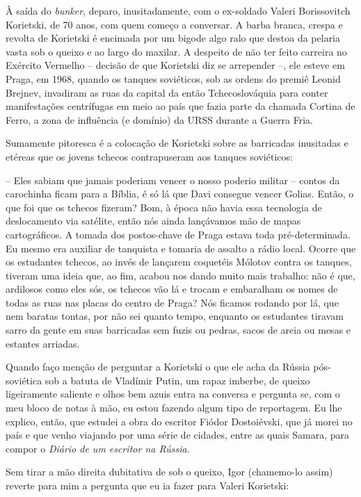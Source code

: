 À saída do \emph{bunker}, deparo, inusitadamente, com o ex-soldado
Valeri Borissovitch Korietski, de 70 anos, com quem começo a conversar.
A barba branca, crespa e revolta de Korietski é encimada por um bigode
algo ralo que destoa da pelaria vasta sob o queixo e ao largo do
maxilar. A despeito de não ter feito carreira no Exército Vermelho --
decisão de que Korietski diz se arrepender --, ele esteve em Praga, em
1968, quando os tanques soviéticos, sob as ordens do premiê Leonid
Brejnev, invadiram as ruas da capital da então Tchecoslováquia para
conter manifestações centrífugas em meio ao país que fazia parte da
chamada Cortina de Ferro, a zona de influência (e domínio) da URSS
durante a Guerra Fria.

Sumamente pitoresca é a colocação de Korietski sobre as barricadas
inusitadas e etéreas que os jovens tchecos contrapuseram aos tanques
soviéticos:

-- Eles sabiam que jamais poderiam vencer o nosso poderio militar --
contos da carochinha ficam para a Bíblia, é só lá que Davi consegue
vencer Golias. Então, o que foi que os tchecos fizeram? Bom, à época não
havia essa tecnologia de deslocamento via satélite, então nós ainda
lançávamos mão de mapas cartográficos. A tomada dos postos-chave de
Praga estava toda pré-determinada. Eu mesmo era auxiliar de tanquista e
tomaria de assalto a rádio local. Ocorre que os estudantes tchecos, ao
invés de lançarem coquetéis Mólotov contra os tanques, tiveram uma ideia
que, ao fim, acabou nos dando muito mais trabalho: não é que, ardilosos
como eles sós, os tchecos vão lá e trocam e embaralham os nomes de todas
as ruas nas placas do centro de Praga? Nós ficamos rodando por lá, que
nem baratas tontas, por não sei quanto tempo, enquanto os estudantes
tiravam sarro da gente em suas barricadas sem fuzis ou pedras, sacos de
areia ou mesas e estantes arriadas.

Quando faço menção de perguntar a Korietski o que ele acha da Rússia
pós-soviética sob a batuta de Vladímir Putin, um rapaz imberbe, de
queixo ligeiramente saliente e olhos bem azuis entra na conversa e
pergunta se, com o meu bloco de notas à mão, eu estou fazendo algum tipo
de reportagem. Eu lhe explico, então, que estudei a obra do escritor
Fiódor Dostoiévski, que já morei no país e que venho viajando por uma
série de cidades, entre as quais Samara, para compor o \emph{Diário de
um escritor na Rússia. }

Sem tirar a mão direita dubitativa de sob o queixo, Igor (chamemo-lo
assim) reverte para mim a pergunta que eu ia fazer para Valeri
Korietski:

